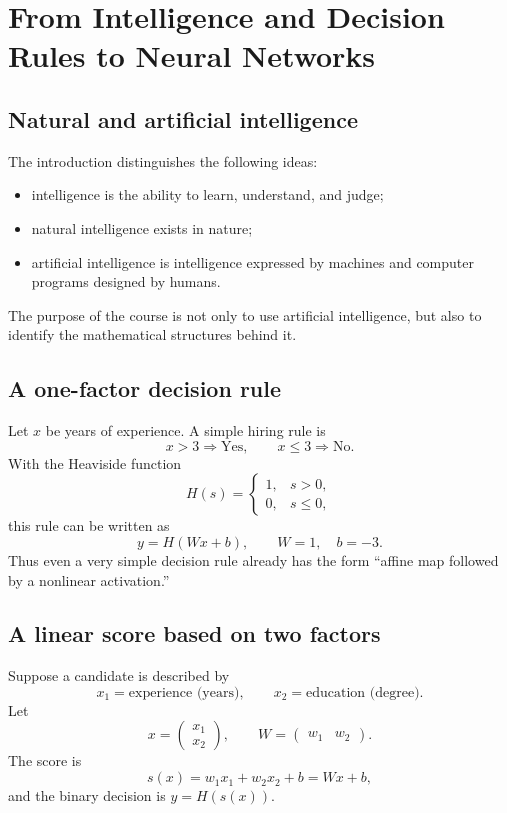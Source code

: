 \documentclass[11pt,a4paper]{article}
\theoremstyle{definition}
\theoremstyle{plain}
\theoremstyle{remark}
\begin{document}
\section{From Intelligence and Decision Rules to Neural Networks}

\subsection{Natural and artificial intelligence}
The introduction distinguishes the following ideas:
\begin{itemize}
  \item intelligence is the ability to learn, understand, and judge;
  \item natural intelligence exists in nature;
  \item artificial intelligence is intelligence expressed by machines and computer programs designed by humans.
\end{itemize}
The purpose of the course is not only to use artificial intelligence, but also to identify the mathematical structures behind it.

\subsection{A one-factor decision rule}
Let $x$ be years of experience. A simple hiring rule is
\[
  x>3 \Longrightarrow \text{Yes},
  \qquad
  x\le 3 \Longrightarrow \text{No}.
\]
With the Heaviside function
\[
  H(s)=
  \begin{cases}
    1,&s>0,\\
    0,&s\le 0,
  \end{cases}
\]
this rule can be written as
\[
  y=H(Wx+b),\qquad W=1,\quad b=-3.
\]
Thus even a very simple decision rule already has the form ``affine map followed by a nonlinear activation.''

\subsection{A linear score based on two factors}
Suppose a candidate is described by
\[
  x_1=\text{experience (years)},\qquad x_2=\text{education (degree)}.
\]
Let
\[
  x=\begin{pmatrix}x_1\\x_2\end{pmatrix},
  \qquad
  W=\begin{pmatrix}w_1&w_2\end{pmatrix}.
\]
The score is
\[
  s(x)=w_1x_1+w_2x_2+b=Wx+b,
\]
and the binary decision is $y=H(s(x))$.
\end{document}
